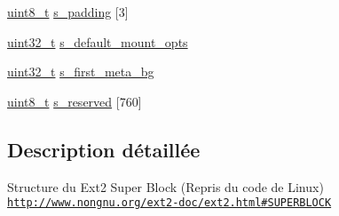 \begin{DoxyCompactItemize}
\item 
\hyperlink{kernel_2include_2types_8h_aba7bc1797add20fe3efdf37ced1182c5}{uint8\+\_\+t} \hyperlink{structext2__super__block_a81b4e1959f344b5b7445044806d27807}{s\+\_\+padding} \mbox{[}3\mbox{]}
\item 
\hyperlink{kernel_2include_2types_8h_a33594304e786b158f3fb30289278f5af}{uint32\+\_\+t} \hyperlink{structext2__super__block_a8f4946dffa8c6a9027ee9329fd3f94c9}{s\+\_\+default\+\_\+mount\+\_\+opts}
\item 
\hyperlink{kernel_2include_2types_8h_a33594304e786b158f3fb30289278f5af}{uint32\+\_\+t} \hyperlink{structext2__super__block_a436c7c8af548ade7f8045e88c2861d61}{s\+\_\+first\+\_\+meta\+\_\+bg}
\item 
\hyperlink{kernel_2include_2types_8h_aba7bc1797add20fe3efdf37ced1182c5}{uint8\+\_\+t} \hyperlink{structext2__super__block_a17e0d263a7fceb8b53aff24b66c216df}{s\+\_\+reserved} \mbox{[}760\mbox{]}
\end{DoxyCompactItemize}


\subsection{Description détaillée}
Structure du Ext2 Super Block (Repris du code de Linux) \href{http://www.nongnu.org/ext2-doc/ext2.html#SUPERBLOCK}{\tt http\+://www.\+nongnu.\+org/ext2-\/doc/ext2.\+html\#\+S\+U\+P\+E\+R\+B\+L\+O\+C\+K} 

